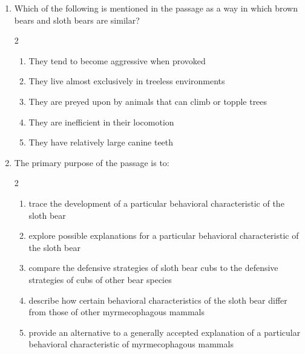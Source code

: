 \documentclass[12pt]{article}
\begin{document}
\begin{enumerate}[label=\textbf{\arabic*.}]
\begin{multicols}{2}
\begin{enumerate}[label=(\Alph*)]
\end{enumerate}

\end{multicols}

\item Which of the following is mentioned in the passage as a way in which brown bears and sloth bears are similar?

\begin{multicols}{2}

\begin{enumerate}[label=(\Alph*)]

\item They tend to become aggressive when provoked

\item They live almost exclusively in treeless environments

\item They are preyed upon by animals that can climb or topple trees

\item They are inefficient in their locomotion

\item They have relatively large canine teeth

\end{enumerate}

\end{multicols}

\item The primary purpose of the passage is to:

\begin{multicols}{2}

\begin{enumerate}[label=(\Alph*)]

\item trace the development of a particular behavioral characteristic of the sloth bear

\item explore possible explanations for a particular behavioral characteristic of the sloth bear

\item compare the defensive strategies of sloth bear cubs to the defensive strategies of cubs of other bear species

\item describe how certain behavioral characteristics of the sloth bear differ from those of other myrmecophagous mammals

\item provide an alternative to a generally accepted explanation of a particular behavioral characteristic of myrmecophagous mammals


\end{enumerate}
\end{multicols}
\end{enumerate}
\end{document}

